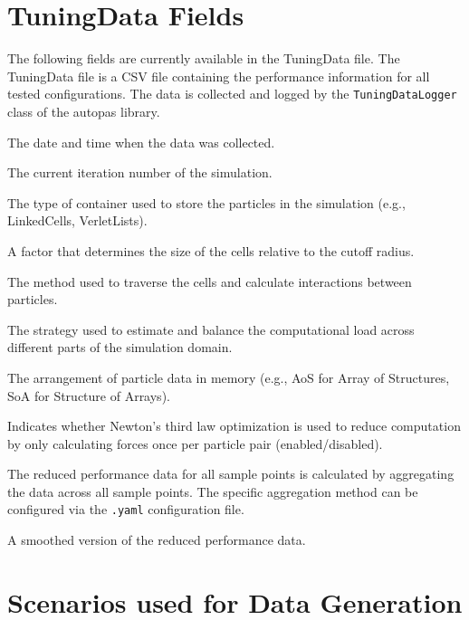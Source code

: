 \section{TuningData Fields}
\label{des:tuningdatafields}

The following fields are currently available in the TuningData file.
The TuningData file is a CSV file containing the performance information for all tested configurations. The data is collected and logged by the \texttt{TuningDataLogger} class of the \gls{autopas} library.

\begin{description}[style=multiline, leftmargin =40mm]
  \item[Date] The date and time when the data was collected.
  \item[Iteration] The current iteration number of the simulation.
  \item[Container] The type of container used to store the particles in the simulation (e.g., LinkedCells, VerletLists).
  \item[CellSizeFactor] A factor that determines the size of the cells relative to the cutoff radius.
  \item[Traversal] The method used to traverse the cells and calculate interactions between particles.
  \item[Load Estimator] The strategy used to estimate and balance the computational load across different parts of the simulation domain.
  \item[Data Layout] The arrangement of particle data in memory (e.g., AoS for Array of Structures, SoA for Structure of Arrays).
  \item[Newton 3] Indicates whether Newton's third law optimization is used to reduce computation by only calculating forces once per particle pair (enabled/disabled).
  \item[Reduced] The reduced performance data for all sample points is calculated by aggregating the data across all sample points. The specific aggregation method can be configured via the \texttt{.yaml} configuration file.
  \item[Smoothed] A smoothed version of the reduced performance data.

\end{description}

\section{Scenarios used for Data Generation}
\label{des:scenarios}

